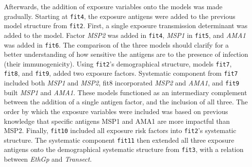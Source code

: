 Afterwards, the addition of exposure variables onto the models was made gradually.
Starting at \texttt{fit4}, the exposure antigens were added to the previous model structure from \texttt{fit2}.
First, a single exposure transmission determinant was added to the model.
Factor \textit{MSP2} was added in \texttt{fit4}, \textit{MSP1} in \texttt{fit5}, and \textit{AMA1} was added in \texttt{fit6}.
The comparison of the three models should clarify for a better understanding of how sensitive the antigens are to the presence of infection (their immunogenicity).
Using \texttt{fit2}'s demographical structure, models \texttt{fit7}, \texttt{fit8}, and \texttt{fit9}, added two exposure factors.
Systematic component from \texttt{fit7} included both \textit{MSP1} and \textit{MSP2}, fit8 incorporated \textit{MSP2} and \textit{AMA1}, and \texttt{fit9} built \textit{MSP1} and \textit{AMA1}.
These models functioned as an intermediary complement between the addition of a single antigen factor, and the inclusion of all three.
The order by which the exposure variables were included was based on previous knowledge that specific antigens MSP1 and AMA1 are more impactful than MSP2.
Finally, \texttt{fit10} included all exposure risk factors into \texttt{fit2}'s systematic structure.
The systematic component \texttt{fit11} then extended all three exposure antigens onto the demographical systematic structure from \texttt{fit3}, with a relation between \textit{EthGp} and \textit{Transect}.

